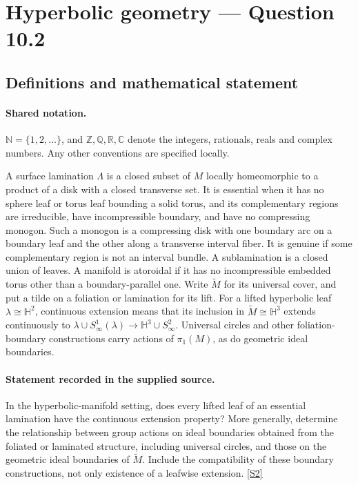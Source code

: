 \documentclass[11pt]{article}
\newcommand{\sref}[2]{\hyperlink{source:#1:#2}{[S#2]}}
\begin{document}
\section{Hyperbolic geometry — Question 10.2}\label{statement}

\subsection{Definitions and mathematical statement}

\paragraph{Shared notation.}$\mathbb N=\{1,2,\ldots\}$, and $\mathbb Z,\mathbb Q,\mathbb R,\mathbb C$ denote the integers, rationals, reals and complex numbers. Any other conventions are specified locally.


A surface lamination $\Lambda$ is a closed subset of $M$ locally homeomorphic to a product of a disk with a closed transverse set. It is essential when it has no sphere leaf or torus leaf bounding a solid torus, and its complementary regions are irreducible, have incompressible boundary, and have no compressing monogon. Such a monogon is a compressing disk with one boundary arc on a boundary leaf and the other along a transverse interval fiber. It is genuine if some complementary region is not an interval bundle. A sublamination is a closed union of leaves. A manifold is atoroidal if it has no incompressible embedded torus other than a boundary-parallel one. Write $\widetilde M$ for its universal cover, and put a tilde on a foliation or lamination for its lift. For a lifted hyperbolic leaf $\lambda\cong\mathbb H^2$, continuous extension means that its inclusion in $\widetilde M\cong\mathbb H^3$ extends continuously to $\lambda\cup S^1_\infty(\lambda)\to\mathbb H^3\cup S^2_\infty$. Universal circles and other foliation-boundary constructions carry actions of $\pi_1(M)$, as do geometric ideal boundaries.
\paragraph{Statement recorded in the supplied source.}
In the hyperbolic-manifold setting, does every lifted leaf of an essential lamination have the continuous extension property? More generally, determine the relationship between group actions on ideal boundaries obtained from the foliated or laminated structure, including universal circles, and those on the geometric ideal boundaries of $\widetilde M$. Include the compatibility of these boundary constructions, not only existence of a leafwise extension. \sref{statement}{2}
\end{document}

